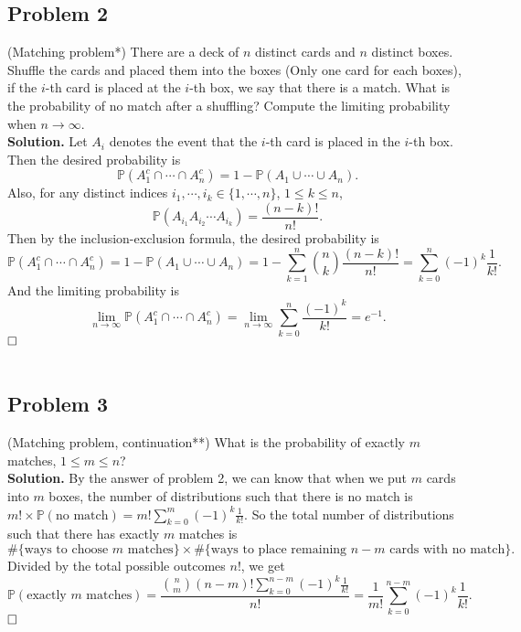 \documentclass[12pt]{article}
\begin{document}
\subsection*{Problem 2} (Matching problem*) There are a deck of $n$ distinct cards and $n$ distinct boxes. Shuffle
the cards and placed them into the boxes (Only one card for each boxes), if the $i$-th card
is placed at the $i$-th box, we say that there is a match. What is the probability of no
match after a shuffling? Compute the limiting probability when $n\rightarrow\infty$.
\\
\textbf{Solution.} Let $A_i$ denotes the event that the $i$-th card is placed in the $i$-th box. Then the desired probability is
\begin{equation*}
\mathbb{P}(A_1^c\cap\cdots\cap A_n^c)=1-\mathbb{P}(A_1\cup\cdots\cup A_n).
\end{equation*}
Also, for any distinct indices $i_1,\cdots,i_k\in\{1,\cdots,n\}$, $1\leq k\leq n$,
\begin{equation*}
\mathbb{P}(A_{i_1}A_{i_2}\cdots A_{i_k})=\frac{(n-k)!}{n!}.
\end{equation*}
Then by the inclusion-exclusion formula, the desired probability is
\begin{equation*}
\mathbb{P}(A_1^c\cap\cdots\cap A_n^c)=1-\mathbb{P}(A_1\cup\cdots\cup A_n)=1-\sum_{k=1}^n\binom{n}{k}\frac{(n-k)!}{n!}=\sum_{k=0}^n(-1)^k\frac{1}{k!}.
\end{equation*}
And the limiting probability is
\begin{equation*}
\lim_{n\rightarrow\infty}\mathbb{P}(A_1^c\cap\cdots\cap A_n^c)=\lim_{n\rightarrow\infty}\sum_{k=0}^n\frac{(-1)^k}{k!}=e^{-1}.
\end{equation*}
$\hspace{\fill}\square$
\\ \\
\subsection*{Problem 3} (Matching problem, continuation**) What is the probability of exactly $m$ matches, $1\leq m\leq n$?
\\
\textbf{Solution.} By the answer of problem 2, we can know that when we put $m$ cards into $m$ boxes, the number of distributions such that there is no match is $m!\times\mathbb{P}(\text{no match})=m!\sum_{k=0}^m(-1)^k\frac{1}{k!}$. So the total number of distributions such that there has exactly $m$ matches is
\begin{equation*}
\#\{\text{ways to choose $m$ matches}\}\times \#\{\text{ways to place remaining $n-m$ cards with no match}\}.
\end{equation*}
Divided by the total possible outcomes $n!$, we get
\begin{equation*}
\mathbb{P}(\text{exactly $m$ matches})=\frac{\binom{n}{m}(n-m)!\sum_{k=0}^{n-m}(-1)^k\frac{1}{k!}}{n!}=\frac{1}{m!}\sum_{k=0}^{n-m}(-1)^k\frac{1}{k!}.
\end{equation*}
$\hspace{\fill}\square$
\\ \\
\end{document}

